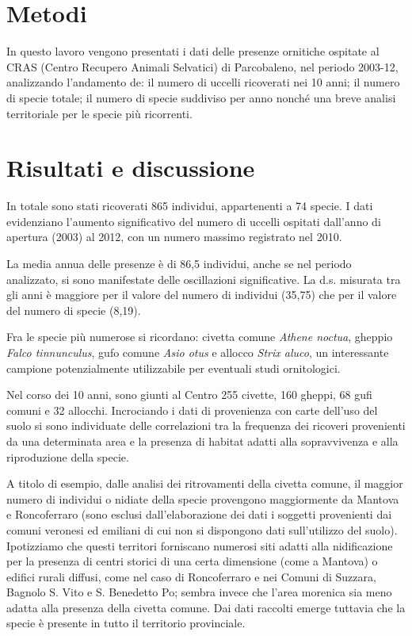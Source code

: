 \section*{Metodi}
In questo lavoro vengono presentati i dati delle presenze ornitiche
ospitate al CRAS (Centro Recupero Animali Selvatici) di Parcobaleno,
nel periodo 2003-12, analizzando l{\textquoteright}andamento de: il
numero di uccelli ricoverati nei 10 anni; il numero di specie totale;
il numero di specie suddiviso per anno nonch\'e una breve analisi
territoriale per le specie pi\`u ricorrenti. 

\section*{Risultati e discussione}
In totale sono stati ricoverati 865 individui, appartenenti a 74 specie.
I dati evidenziano l{\textquoteright}aumento significativo del numero
di uccelli ospitati dall{\textquoteright}anno di apertura (2003) al
2012, con un numero massimo registrato nel 2010.\textcolor{red}{ }

La media annua delle presenze \`e di 86,5 individui, anche se nel
periodo analizzato, si sono manifestate delle oscillazioni
significative. La d.s. misurata tra gli anni \`e maggiore per il valore
del numero di individui (35,75) che per il valore del numero di specie
(8,19). 

Fra le specie pi\`u numerose si ricordano: civetta comune \textit{Athene
noctua}, gheppio \textit{Falco tinnunculus}, gufo comune \textit{Asio
otus} e allocco \textit{Strix aluco}, un interessante campione
potenzialmente utilizzabile per eventuali studi ornitologici. 

Nel corso dei 10 anni, sono giunti al Centro 255 civette, 160 gheppi, 68
gufi comuni e 32 allocchi. Incrociando i dati di provenienza con carte
dell{\textquoteright}uso del suolo si sono individuate delle
correlazioni tra la frequenza dei ricoveri provenienti da una
determinata area e la presenza di habitat adatti alla sopravvivenza e
alla riproduzione della specie. 

A titolo di esempio, dalle analisi dei ritrovamenti della civetta
comune, il maggior numero di individui o nidiate della specie
provengono maggiormente da Mantova e Roncoferraro (sono esclusi
dall{\textquoteright}elaborazione dei dati i soggetti provenienti dai
comuni veronesi ed emiliani di cui non si dispongono dati
sull'utilizzo del suolo). Ipotizziamo che questi
territori forniscano numerosi siti adatti alla nidificazione per la
presenza di centri storici di una certa dimensione (come a Mantova) o
edifici rurali diffusi, come nel caso di Roncoferraro e nei Comuni di
Suzzara, Bagnolo S. Vito e S. Benedetto Po; sembra invece che
l{\textquoteright}area morenica sia meno adatta alla presenza della
civetta comune. Dai dati raccolti emerge tuttavia che la specie \`e
presente in tutto il territorio provinciale. 


